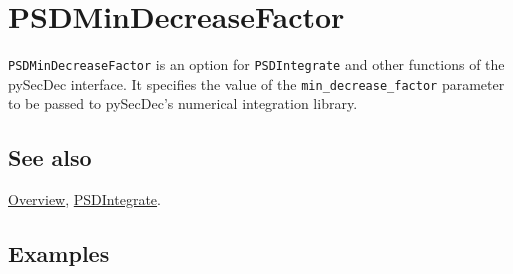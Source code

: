 \documentclass[../FeynHelpersManual.tex]{subfiles}
\begin{document}
\hypertarget{psdmindecreasefactor}{
\section{PSDMinDecreaseFactor}\label{psdmindecreasefactor}}

\texttt{PSDMinDecreaseFactor} is an option for \texttt{PSDIntegrate} and
other functions of the pySecDec interface. It specifies the value of the
\texttt{min_decrease_factor} parameter to be passed to pySecDec's
numerical integration library.

\subsection{See also}

\hyperlink{toc}{Overview}, \hyperlink{psdintegrate}{PSDIntegrate}.

\subsection{Examples}
\end{document}
